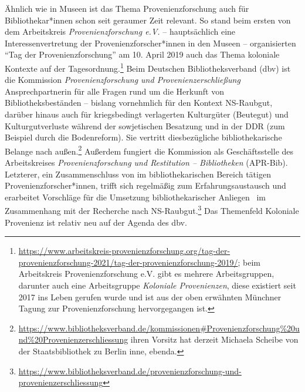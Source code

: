 \documentclass[a4paper,
fontsize=11pt,
oneside,
numbers=noperiodatend,
parskip=half-,
bibliography=totoc,
final
]{scrartcl}
\begin{document}
Ähnlich wie in Museen ist das Thema Provenienzforschung auch für
Bibliothekar*innen schon seit geraumer Zeit relevant. So stand beim
ersten von dem Arbeitskreis \emph{Provenienzforschung e.V.} --
hauptsächlich eine Interessenvertretung der Provenienzforscher*innen in
den Museen -- organisierten \enquote{Tag der Provenienzforschung} am 10.
April 2019 auch das Thema koloniale Kontexte auf der
Tagesordnung.\footnote{\url{https://www.arbeitskreis-provenienzforschung.org/tag-der-provenienzforschung-2021/tag-der-provenienzforschung-2019/};
  beim Arbeitskreis Provenienzforschung e.V. gibt es mehrere
  Arbeitsgruppen, darunter auch eine Arbeitsgruppe \emph{Koloniale
  Provenienzen}, diese existiert seit 2017 ins Leben gerufen wurde und
  ist aus der oben erwähnten Münchner Tagung zur Provenienzforschung
  hervorgegangen ist.} Beim Deutschen Bibliotheksverband (dbv) ist die
Kommission \emph{Provenienzforschung und Provenienzerschließung}
Ansprechpartnerin für alle Fragen rund um die Herkunft von
Bibliotheksbeständen -- bislang vornehmlich für den Kontext NS-Raubgut,
darüber hinaus auch für kriegsbedingt verlagerten Kulturgüter (Beutegut)
und Kulturgutverluste während der sowjetischen Besatzung und in der DDR
(zum Beispiel durch die Bodenreform). Sie vertritt diesbezügliche
bibliothekarische Belange nach außen.\footnote{\url{https://www.bibliotheksverband.de/kommissionen\#Provenienzforschung\%20und\%20Provenienzerschliessung}
  ihren Vorsitz hat derzeit Michaela Scheibe von der Staatsbibliothek zu
  Berlin inne, ebenda.} Außerdem fungiert die Kommission als
Geschäftsstelle des Arbeitskreises \emph{Provenienzforschung und
Restitution -- Bibliotheken} (APR-Bib). Letzterer, ein Zusammenschluss
von im bibliothekarischen Bereich tätigen Provenienzforscher*innen,
trifft sich regelmäßig zum Erfahrungsaustausch und erarbeitet Vorschläge
für die Umsetzung bibliothekarischer Anliegen~ im Zusammenhang mit der
Recherche nach NS-Raubgut.\footnote{\url{https://www.bibliotheksverband.de/provenienzforschung-und-provenienzerschliessung}}
Das Themenfeld Koloniale Provenienz ist relativ neu auf der Agenda des
dbv.
\end{document}
